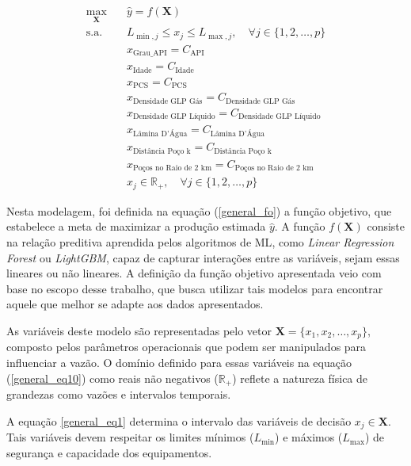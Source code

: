 \begin{align}
    \max_{\mathbf{X}} & \quad \hat{y} = f(\mathbf{X}) \label{general_fo} \\
    \text{s.a.} & \quad L_{\min, j} \le x_j \le L_{\max, j}, \quad \forall j \in \{1, 2, \dots, p\} \label{general_eq1} \\
    & \quad x_{\text{Grau\_API}} = C_{\text{API}} \label{general_eq2} \\
    & \quad x_{\text{Idade}} = C_{\text{Idade}} \label{general_eq3} \\
    & \quad x_{\text{PCS}} = C_{\text{PCS}} \label{general_eq4} \\
    & \quad x_{\text{Densidade GLP Gás}} = C_{\text{Densidade GLP Gás}} \label{general_eq5} \\
    & \quad x_{\text{Densidade GLP Líquido}} = C_{\text{Densidade GLP Líquido}} \label{general_eq6} \\
    & \quad x_{\text{Lâmina D'Água}} = C_{\text{Lâmina D'Água}} \label{general_eq7} \\
    & \quad x_{\text{Distância Poço k}} = C_{\text{Distância Poço k}} \label{general_eq8} \\
    & \quad x_{\text{Poços no Raio de 2 km}} = C_{\text{Poços no Raio de 2 km}} \label{general_eq9} \\
    & \quad x_j \in \mathbb{R}_{+}, \quad \forall j \in \{1, 2, \dots, p\} \label{general_eq10}
\end{align}

Nesta modelagem, foi definida na equação (\ref{general_fo}) a função objetivo, que estabelece a meta de maximizar a produção estimada $\hat{y}$. A função $f(\mathbf{X})$ consiste na relação preditiva aprendida pelos algoritmos de \gls{ML}, como \textit{Linear Regression Forest} ou \textit{LightGBM}, capaz de capturar interações entre as variáveis, sejam essas lineares ou não lineares. A definição da função objetivo apresentada veio com base no escopo desse trabalho, que busca utilizar tais modelos para encontrar aquele que melhor se adapte aos dados apresentados.

As variáveis deste modelo são representadas pelo vetor $\mathbf{X}=\{x_1, x_2, \dots, x_p\}$, composto pelos parâmetros operacionais que podem ser manipulados para influenciar a vazão. O domínio definido para essas variáveis na equação (\ref{general_eq10}) como reais não negativos ($\mathbb{R}_{+}$) reflete a natureza física de grandezas como vazões e intervalos temporais.

A equação \ref{general_eq1} determina o intervalo das variáveis de decisão $x_j \in \mathbf{X}$. 
Tais variáveis devem respeitar os limites mínimos ($L_{\min}$) e máximos ($L_{\max}$) de segurança e capacidade dos equipamentos.

